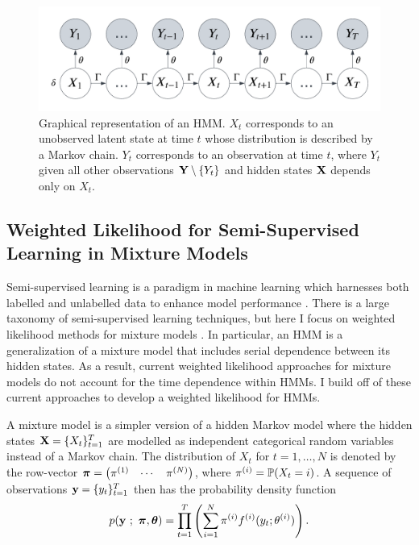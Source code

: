 \begin{figure}%
    \centering
    \includegraphics[width=5in]{../plt/HMM.png}
    \caption{Graphical representation of an HMM. $X_t$ corresponds to an unobserved latent state at time $t$ whose distribution is described by a Markov chain. $Y_t$ corresponds to an observation at time $t$, where $Y_t$ given all other observations $\mathbf{Y} \setminus \{Y_t\}$ and hidden states $\mathbf{X}$ depends only on $X_t$.}
    \label{fig:HMM}
\end{figure}

\subsection{Weighted Likelihood for Semi-Supervised Learning in Mixture Models}

Semi-supervised learning is a paradigm in machine learning which harnesses both labelled and unlabelled data to enhance model performance \citep{Chapelle:2006}. There is a large taxonomy of semi-supervised learning techniques, but here I focus on weighted likelihood methods for mixture models \citep{Nigam:2000, vanEngelen:2020}. In particular, an HMM is a generalization of a mixture model that includes serial dependence between its hidden states. As a result, current weighted likelihood approaches for mixture models do not account for the time dependence within HMMs. I build off of these current approaches to develop a weighted likelihood for HMMs. 

A mixture model is a simpler version of a hidden Markov model where the hidden states $\mathbf{X} = \{X_t\}_{t=1}^T$ are modelled as independent categorical random variables instead of a Markov chain. The distribution of $X_t$ for $t = 1, \ldots, N$ is denoted by the row-vector $\boldsymbol{\pi} = \begin{pmatrix} \pi^{(1)} & \cdots & \pi^{(N)} \end{pmatrix}$, where $\pi^{(i)} = \mathbb{P}(X_t = i)$. A sequence of observations $\mathbf{y} = \{y_t\}_{t=1}^T$ then has the probability density function
%
\begin{equation}
    p(\mathbf{y} ~;~ \boldsymbol{\pi},\boldsymbol{\theta}) = \prod_{t=1}^T \left(\sum_{i = 1}^N \pi^{(i)} f^{(i)}(y_t; \theta^{(i)}) \right). 
    \label{eqn:like_marginal}
\end{equation}

